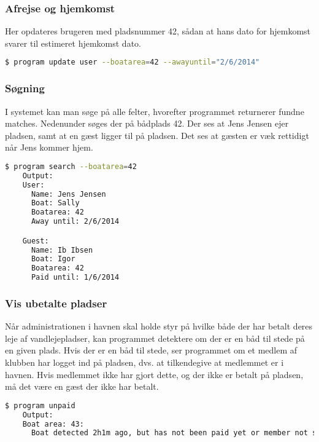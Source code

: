 \subsubsection{Afrejse og hjemkomst}
\label{ssub:Afrejse_og_hjemkomst}

Her opdateres brugeren med pladsnummer 42, sådan at hans dato for hjemkomst svarer til estimeret hjemkomst dato.

\begin{lstlisting}[language=bash, label={lst:update_travel}] 
  $ program update user --boatarea=42 --awayuntil="2/6/2014" 
\end{lstlisting}

\subsubsection{Søgning}
\label{ssub:Sogning}

I systemet kan man søge på alle felter, hvorefter programmet returnerer fundne matches. Nedenunder søges der på bådplads 42. Der ses at Jens Jensen ejer pladsen, samt at en gæst ligger til på pladsen. Det ses at gæsten er væk rettidigt når Jens kommer hjem.

\begin{lstlisting}[language=bash, label={lst:search}] 
  $ program search --boatarea=42
    Output:
    User:
      Name: Jens Jensen
      Boat: Sally
      Boatarea: 42
      Away until: 2/6/2014 

    Guest:
      Name: Ib Ibsen
      Boat: Igor
      Boatarea: 42
      Paid until: 1/6/2014
\end{lstlisting}

\subsubsection{Vis ubetalte pladser}
\label{ssub:Vis_ubetalte_pladser}

Når administrationen i havnen skal holde styr på hvilke både der har betalt deres leje af vandlejepladser, kan programmet detektere om der er en båd til stede på en given plads. Hvis der er en båd til stede, ser programmet om et medlem af klubben har logget ind på pladsen, dvs. at tilkendegive at medlemmet er i havnen. Hvis medlemmet ikke har gjort dette, og der ikke er betalt på pladsen, må det være en gæst der ikke har betalt.

\begin{lstlisting}[language=bash, label={lst:show_unpaid}] 
  $ program unpaid
    Output:
    Boat area: 43:
      Boat detected 2h1m ago, but has not been paid yet or member not signed in. 
\end{lstlisting}

